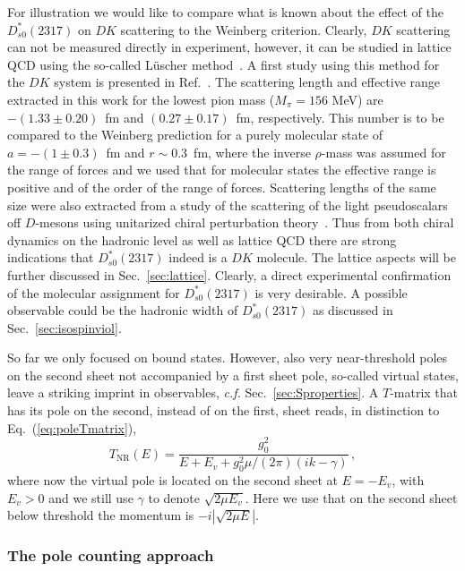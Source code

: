 For illustration we would like to compare what is known about the effect of the
$D_{s0}^*(2317)$ on $DK$ scattering to the Weinberg criterion. Clearly, $DK$
scattering can not be measured directly in experiment, however, it can be
studied in lattice QCD using the so-called L\"uscher
method~\cite{Luscher:1990ux}.
A first study using this method for the $DK$ system is presented in
Ref.~\cite{Mohler:2013rwa}.
The scattering length and effective range extracted in this work for the lowest
pion mass ($M_\pi=156$ MeV) are $-(1.33\pm 0.20)$~fm and $(0.27 \pm 0.17)$~fm,
respectively. This number is to be compared to the Weinberg prediction for a
purely molecular state of $a=-(1\pm 0.3)$~fm and $r\sim 0.3$~fm, where the
inverse $\rho$-mass was assumed for the range of forces and we used that for
molecular states the effective range is positive and of the order of the range
of forces.
Scattering lengths of the same size were also extracted from a study of the
scattering of the light pseudoscalars off $D$-mesons using unitarized chiral
perturbation theory~\cite{Liu:2012zya}. Thus from both chiral dynamics on the
hadronic level as well as lattice QCD there are strong indications that
$D_{s0}^*(2317)$ indeed is a $DK$ molecule. The lattice aspects will be further
discussed in Sec.~\ref{sec:lattice}. Clearly, a direct experimental confirmation
of the molecular assignment for $D_{s0}^*(2317)$ is very desirable. A possible
observable could be the hadronic width of $D_{s0}^*(2317)$ as discussed in
Sec.~\ref{sec:isospinviol}.


So far we only focused on bound states. However, also very near-threshold poles
on the second sheet not accompanied by a first sheet pole, so-called virtual
states, leave a striking imprint in observables, {\sl c.f.}
Sec.~\ref{sec:Sproperties}.
A $T$-matrix that has its pole on the second, instead of on the first, sheet
reads, in distinction to Eq.~(\ref{eq:poleTmatrix}),
\begin{equation}
T_\text{NR}(E) = \frac{g_0^2}{E+E_v+ g_0^2 \mu/(2\pi) (i k-\gamma)} \, ,
\label{eq:poleTmatrix2}
\end{equation}
where now the virtual pole is located on the second sheet at $E=-E_v$, with
$E_v>0$ and we still use $\gamma$ to denote $\sqrt{2\mu E_v}$.
Here we use that on the second sheet below threshold the momentum is 
$-i|\sqrt{2\mu E}|$. 


\subsubsection{The pole counting approach}
\label{sec:polecounting}

